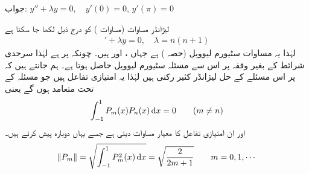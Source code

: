 جواب:
$y''+\lambda y=0, \quad y'(0)=0, \, y'(\pi)=0$

لیژانڈر  مساوات (مساوات ) کو درج ذیل لکھا جا سکتا ہے
\begin{align}
[(1-x^2)y']'+\lambda y=0,\quad \lambda=n(n+1)
\end{align}
لہٰذا یہ  مساوات سٹیورم لیوویل (حصہ ) ہے جہاں ،  اور  ہیں۔ چونکہ  پر  ہے لہٰذا  سرحدی شرائط کے بغیر وقفہ  پر اس سے مسئلہ سٹیورم لیوویل حاصل ہوتا ہے۔  ہم جانتے ہیں کہ  پر اس مسئلے کے حل لیژانڈر کثیر رکنی  ہیں لہٰذا یہ امتیازی تفاعل ہیں جو مسئلہ  کے تحت  متعامد ہوں گے یعنی
\begin{align}
\int_{-1}^{1}P_m(x)P_n(x)\dif x=0\quad \quad (m \ne n)
\end{align}
اور ان امتیازی تفاعل کا معیار مساوات  دیتی ہے جسے یہاں دوبارہ پیش کرتے ہیں۔
\begin{align}\label{مساوات_طاقتی_معیار_دوبارہ_پیش}
\norm{P_m}=\sqrt{\int_{-1}^{1} P_m^2(x) \dif x}=\sqrt{\frac{2}{2m+1}}\quad \quad m=0,1,\cdots
\end{align}

